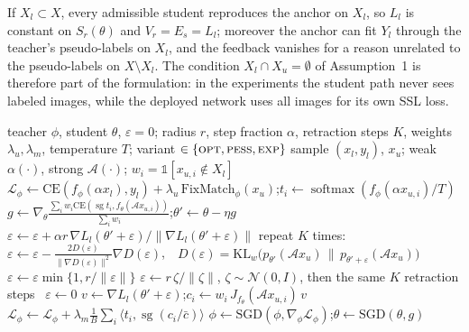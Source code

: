 \begin{remark}
If $X_l\subset X$, every admissible student reproduces the anchor on $X_l$, so $L_l$ is
constant on $S_r(\theta)$ and $V_r=E_s=L_l$; moreover the anchor can fit $Y_l$ through the
teacher's pseudo-labels on $X_l$, and the feedback vanishes for a reason unrelated to the
pseudo-labels on $X\setminus X_l$. The condition $X_l\cap X_u=\emptyset$ of
Assumption~1 is therefore part of the formulation: in the experiments the student path never
sees labeled images, while the deployed network uses all images for its own SSL loss.
\end{remark}

\begin{algorithm}[t]
\caption{TR-BPL on top of FixMatch (two networks; the teacher is deployed)}
\label{alg:trbpl}
\begin{algorithmic}[1]
\Require teacher $\phi$, student $\theta$, $\varepsilon=0$; radius $r$, step fraction $\alpha$,
retraction steps $K$, weights $\lambda_u,\lambda_m$, temperature $T$; variant $\in\{\textsc{opt},\textsc{pess},\textsc{exp}\}$
\State sample $(x_l,y_l)$, $x_u$; weak $\alpha(\cdot)$, strong $\mathcal A(\cdot)$; $w_i=\mathbb 1[x_{u,i}\notin X_l]$
\State $\mathcal L_\phi\gets \mathrm{CE}(f_\phi(\alpha x_l),y_l)+\lambda_u\,\mathrm{FixMatch}_\phi(x_u)$;\quad $t_i\gets\operatorname{softmax}(f_\phi(\alpha x_{u,i})/T)$
\State $g\gets\nabla_\theta\frac{\sum_iw_i\mathrm{CE}(\operatorname{sg}t_i,f_\theta(\mathcal Ax_{u,i}))}{\sum_iw_i}$;\quad $\theta'\gets\theta-\eta g$
 
\State $\varepsilon\gets\varepsilon+\alpha r\,\nabla L_l(\theta'+\varepsilon)/\|\nabla L_l(\theta'+\varepsilon)\|$
\State repeat $K$ times: $\varepsilon\gets\varepsilon-\frac{2D(\varepsilon)}{\|\nabla D(\varepsilon)\|^2}\nabla D(\varepsilon)$,\ \ $D(\varepsilon)=\mathrm{KL}_w\big(p_{\theta'}(\mathcal Ax_u)\,\|\,p_{\theta'+\varepsilon}(\mathcal Ax_u)\big)$
\State $\varepsilon\gets\varepsilon\min\{1,r/\|\varepsilon\|\}$
 \State $\varepsilon\gets r\,\zeta/\|\zeta\|$, $\zeta\sim\mathcal N(0,I)$, then the same $K$ retraction steps
\Else\ $\varepsilon\gets0$
\EndIf
\State $v\gets\nabla L_l(\theta'+\varepsilon)$;\quad $c_i\gets w_i\,J_{f_\theta}(\mathcal Ax_{u,i})\,v$ 
\State $\mathcal L_\phi\gets\mathcal L_\phi+\lambda_m\frac1B\sum_i\langle t_i,\operatorname{sg}(c_i/\bar c)\rangle$ 
\State $\phi\gets\mathrm{SGD}(\phi,\nabla_\phi\mathcal L_\phi)$;\quad $\theta\gets\mathrm{SGD}(\theta,g)$
\EndFor
\end{algorithmic}
\end{algorithm}
